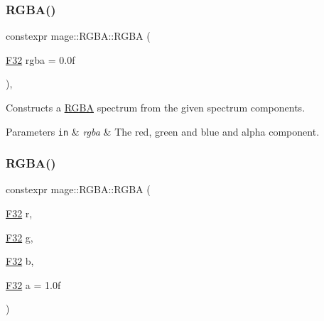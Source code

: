 \subsubsection{\texorpdfstring{R\+G\+B\+A()}{RGBA()}\hspace{0.1cm}{\footnotesize\ttfamily [1/8]}}
{\footnotesize\ttfamily constexpr mage\+::\+R\+G\+B\+A\+::\+R\+G\+BA (\begin{DoxyParamCaption}\item[{\mbox{\hyperlink{namespacemage_aa97e833b45f06d60a0a9c4fc22ae02c0}{F32}}}]{rgba = {\ttfamily 0.0f} }\end{DoxyParamCaption})\hspace{0.3cm}{\ttfamily [explicit]}, {\ttfamily [noexcept]}}

Constructs a \mbox{\hyperlink{structmage_1_1_r_g_b_a}{R\+G\+BA}} spectrum from the given spectrum components.


\begin{DoxyParams}[1]{Parameters}
\mbox{\tt in}  & {\em rgba} & The red, green and blue and alpha component. \\
\hline
\end{DoxyParams}
\mbox{\label{structmage_1_1_r_g_b_a_a12ae339b8bcae0a1c0aacad280963ade}} 
\subsubsection{\texorpdfstring{R\+G\+B\+A()}{RGBA()}\hspace{0.1cm}{\footnotesize\ttfamily [2/8]}}
{\footnotesize\ttfamily constexpr mage\+::\+R\+G\+B\+A\+::\+R\+G\+BA (\begin{DoxyParamCaption}\item[{\mbox{\hyperlink{namespacemage_aa97e833b45f06d60a0a9c4fc22ae02c0}{F32}}}]{r,  }\item[{\mbox{\hyperlink{namespacemage_aa97e833b45f06d60a0a9c4fc22ae02c0}{F32}}}]{g,  }\item[{\mbox{\hyperlink{namespacemage_aa97e833b45f06d60a0a9c4fc22ae02c0}{F32}}}]{b,  }\item[{\mbox{\hyperlink{namespacemage_aa97e833b45f06d60a0a9c4fc22ae02c0}{F32}}}]{a = {\ttfamily 1.0f} }\end{DoxyParamCaption})\hspace{0.3cm}{\ttfamily [noexcept]}}

